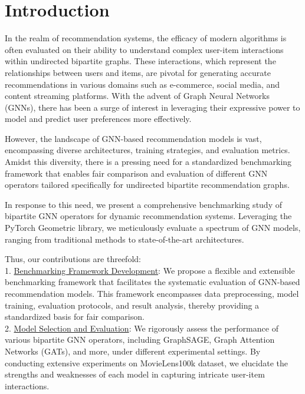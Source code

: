 \documentclass{scrartcl}
\begin{document}
\section{Introduction}\label{sec1}

\quad In the realm of recommendation systems, the efficacy of modern algorithms is often evaluated on their ability to understand complex user-item interactions within undirected bipartite graphs. These interactions, which represent the relationships between users and items, are pivotal for generating accurate recommendations in various domains such as e-commerce, social media, and content streaming platforms. With the advent of Graph Neural Networks (GNNs), there has been a surge of interest in leveraging their expressive power to model and predict user preferences more effectively.

However, the landscape of GNN-based recommendation models is vast, encompassing diverse architectures, training strategies, and evaluation metrics. Amidst this diversity, there is a pressing need for a standardized benchmarking framework that enables fair comparison and evaluation of different GNN operators tailored specifically for undirected bipartite recommendation graphs.

In response to this need, we present a comprehensive benchmarking study of bipartite GNN operators for dynamic recommendation systems. Leveraging the PyTorch Geometric library, we meticulously evaluate a spectrum of GNN models, ranging from traditional methods to state-of-the-art architectures.

Thus, our contributions are threefold: \\ 

1. \underline{Benchmarking Framework Development}: We propose a flexible and extensible benchmarking framework that facilitates the systematic evaluation of GNN-based recommendation models. This framework encompasses data preprocessing, model training, evaluation protocols, and result analysis, thereby providing a standardized basis for fair comparison. \\ 

2. \underline{Model Selection and Evaluation}: We rigorously assess the performance of various bipartite GNN operators, including GraphSAGE, Graph Attention Networks (GATs), and more, under different experimental settings. By conducting extensive experiments on MovieLens100k dataset, we elucidate the strengths and weaknesses of each model in capturing intricate user-item interactions. \\ 
\end{document}
